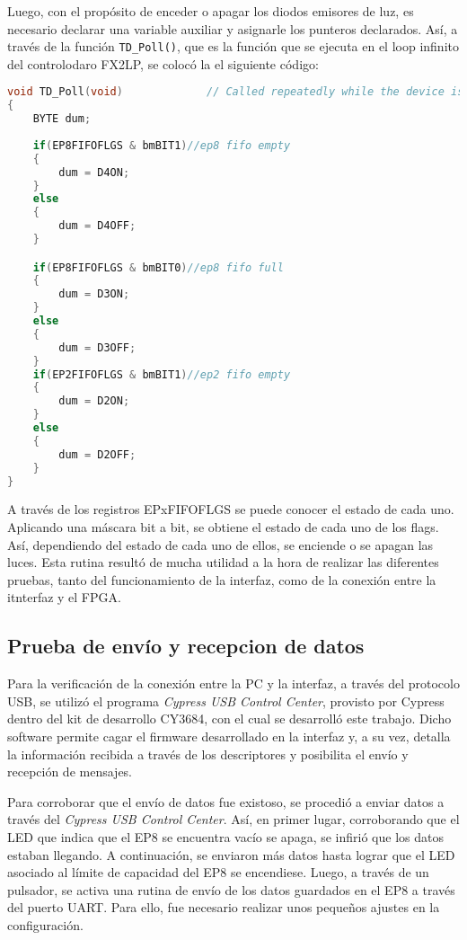 Luego, con el propósito de enceder o apagar los diodos emisores de luz, es necesario declarar una variable auxiliar y asignarle los punteros declarados. Así, a través de la función \verb|TD_Poll()|, que es la función que se ejecuta en el loop infinito del controlodaro FX2LP, se colocó la el siguiente código:

	\begin{lstlisting}[language=C,backgroundcolor=\color{gray!30}]
void TD_Poll(void)             // Called repeatedly while the device is idle  
{
	BYTE dum;
	
	if(EP8FIFOFLGS & bmBIT1)//ep8 fifo empty
	{
		dum = D4ON;
	}
	else
	{
		dum = D4OFF;
	}

	if(EP8FIFOFLGS & bmBIT0)//ep8 fifo full
	{
		dum = D3ON;
	}
	else
	{
		dum = D3OFF;
	}
	if(EP2FIFOFLGS & bmBIT1)//ep2 fifo empty
	{
		dum = D2ON;
	}
	else
	{
		dum = D2OFF;
	}
}
	\end{lstlisting}

A través de los registros EPxFIFOFLGS se puede conocer el estado de cada uno. Aplicando una máscara bit a bit, se obtiene el estado de cada uno de los flags. Así, dependiendo del estado de cada uno de ellos, se enciende o se apagan las luces.
Esta rutina resultó de mucha utilidad a la hora de realizar las diferentes pruebas, tanto del funcionamiento de la interfaz, como de la conexión entre la itnterfaz y el FPGA.

\subsection{Prueba de envío y recepcion de datos}
	Para la verificación de la conexión entre la PC y la interfaz, a través del protocolo USB, se utilizó el programa {\it Cypress USB Control Center}, provisto por Cypress dentro del kit de desarrollo CY3684, con el cual se desarrolló este trabajo. Dicho software permite cagar el firmware desarrollado en la interfaz y, a su vez, detalla la información recibida a través de los descriptores y posibilita el envío y recepción de mensajes.
	
	Para corroborar que el envío de datos fue existoso, se procedió a enviar datos a través del {\it Cypress USB Control Center}. Así, en primer lugar, corroborando que el LED que indica que el EP8 se encuentra vacío se apaga, se infirió que los datos estaban llegando. A continuación, se enviaron más datos hasta lograr que el LED asociado al límite de capacidad del EP8 se encendiese. Luego, a través de un pulsador, se activa una rutina de envío de los datos guardados en el EP8 a través del puerto UART. Para ello, fue necesario realizar unos pequeños ajustes en la configuración.
	
